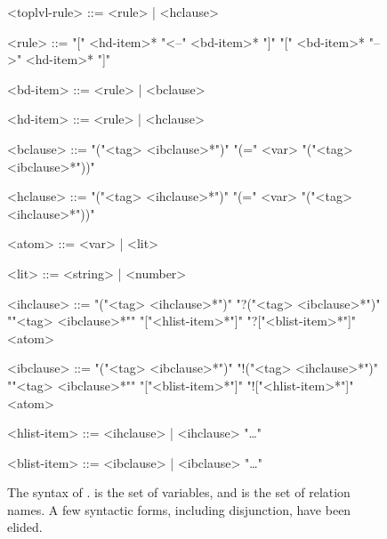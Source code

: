\begin{wrapfigure}{l}{6.75cm}

\setlength{\grammarindent}{7em} %
\begin{grammar}
<toplvl-rule> ::= <rule> | <hclause> 

<rule> ::= "[" <hd-item>* "<--" <bd-item>* "]"
      \alt "[" <bd-item>* "-->" <hd-item>* "]" 

<bd-item> ::= <rule> | <bclause> 

<hd-item> ::= <rule> | <hclause> 

<bclause> ::= "("<tag> <ibclause>*")"  
         \alt "(=" <var> "("<tag> <ibclause>*"))"

<hclause> ::= "("<tag> <ihclause>*")" 
         \alt "(=" <var> "("<tag> <ihclause>*"))"

<atom> ::= <var> | <lit>

<lit> ::= <string> | <number>

<ihclause> ::= "("<tag> <ihclause>*")" 
          \alt "?("<tag> <ibclause>*")"
          \alt "{"<tag> <ibclause>*"}" 
          \alt "["<hlist-item>*"]" 
          \alt "?["<blist-item>*"]"
          \alt <atom>

<ibclause> ::= "("<tag> <ibclause>*")" 
          \alt "!("<tag> <ihclause>*")" 
          \alt "{"<tag> <ibclause>*"}" 
          \alt "["<blist-item>*"]" 
          \alt "!["<hlist-item>*"]"
          \alt <atom>

<hlist-item> ::= <ihclause> | <ihclause> "…"

<blist-item> ::= <ibclause> | <ibclause> "…"
\end{grammar}

\caption{The syntax of \slog{}.  is the set of variables, and  is the set of relation names. A few syntactic forms, including disjunction, have been elided.}
\label{fig:syntax}
\vspace{-1.5cm}
\end{wrapfigure}
%
